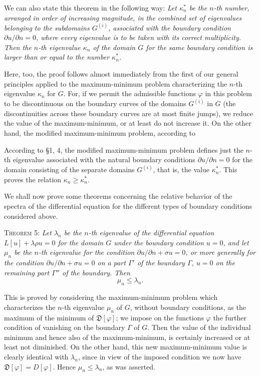 We can also state this theorem in the following way: \emph{Let $\kappa_n^*$ be the $n$-th number, arranged in order of increasing magnitude, in the combined set of eigenvalues belonging to the subdomains $G^{(i)}$, associated with the boundary condition $\partial u/\partial n=0$, where every eigenvalue is to be taken with its correct multiplicity. Then the $n$-th eigenvalue $\kappa_n$ of the domain $G$ for the same boundary condition is larger than or equal to the number $\kappa_n^*$.}

Here, too, the proof follows almost immediately from the first of our general principles applied to the maximum-minimum problem characterizing the $n$-th eigenvalue $\kappa_n$ for $G$. For, if we permit the admissible functions $\varphi$ in this problem to be discontinuous on the boundary curves of the domains $G^{(i)}$ in $G$ (the discontinuities across these boundary curves are at most finite jumps), we reduce the value of the maximum-minimum, or at least do not increase it. On the other hand, the modified maximum-minimum problem, according to


According to \S1, 4, the modified maximum-minimum problem defines just the $n$-th eigenvalue associated with the natural boundary conditions $\partial u/\partial n=0$ for the domain consisting of the separate domains $G^{(i)}$, that is, the value $\kappa_n^*$. This proves the relation $\kappa_n\ge\kappa_n^*$.

We shall now prove some theorems concerning the relative behavior of the spectra of the differential equation for the different types of boundary conditions considered above.

\textsc{Theorem 5:} \emph{Let $\lambda_n$ be the $n$-th eigenvalue of the differential equation $L[u]+\lambda\rho u=0$ for the domain $G$ under the boundary condition $u=0$, and let $\mu_n$ be the $n$-th eigenvalue for the condition $\partial u/\partial n+\sigma u=0$, or more generally for the condition $\partial u/\partial n+\sigma u=0$ on a part $\Gamma'$ of the boundary $\Gamma$, $u=0$ on the remaining part $\Gamma''$ of the boundary. Then}
\[
\mu_n\le\lambda_n.
\]

This is proved by considering the maximum-minimum problem which characterizes the $n$-th eigenvalue $\mu_n$ of $G$, without boundary conditions, as the maximum of the minimum of $\mathfrak D[\varphi]$; we impose on the functions $\varphi$ the further condition of vanishing on the boundary $\Gamma$ of $G$. Then the value of the individual minimum and hence also of the maximum-minimum, is certainly increased or at least not diminished. On the other hand, this new maximum-minimum value is clearly identical with $\lambda_n$, since in view of the imposed condition we now have $\mathfrak D[\varphi]=D[\varphi]$. Hence $\mu_n\le\lambda_n$, as was asserted.

